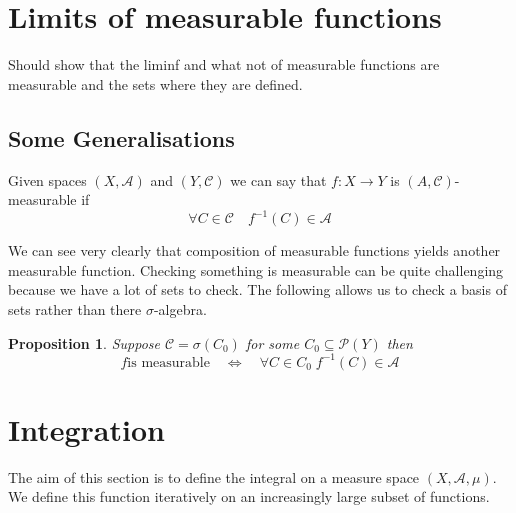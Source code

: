\documentclass[11pt]{article}
\newcommand{\msrspc}{\ensuremath{(X,\mathcal{A},\mu)}}
\newenvironment{defin}
	{\begin{mdframed}[backgroundcolor=white, roundcorner=5pt, linewidth=1pt]}
	{\end{mdframed}}
\newcommand{\mdf}[1]{{\color{red} #1}}
\newtheorem{prop}[theorem]{Proposition}
\begin{document}
\section{Limits of measurable functions}
Should show that the liminf and what not of measurable functions are measurable and the sets where they are defined.

\subsection{Some Generalisations}
\begin{defin}
	Given spaces $(X, \mathcal{A})$ and $(Y, \mathcal{C})$ we can say that $f:X\to Y$ is \mdf{$(A, \mathcal{C})$-measurable} if
	\[
		\forall C \in \mathcal{C}\quad f^{-1}(C)\in \mathcal{A}
	\]	
\end{defin}
We can see very clearly that composition of measurable functions yields another measurable function.
Checking something is measurable can be quite challenging because we have a lot of sets to check.
The following allows us to check a basis of sets rather than there $\sigma$-algebra.
\begin{prop}
Suppose $\mathcal{C}=\sigma(C_0)$ for some $C_0\subseteq\mathcal{P}(Y)$ then
\[
	f \text{is measurable}\quad\iff\quad \forall C\in C_0\; f^{-1}(C)\in \mathcal{A}
\]
\end{prop}
\section{Integration}
The aim of this section is to define the integral on a measure space \msrspc.
We define this function iteratively on an increasingly large subset of functions.
\end{document}
